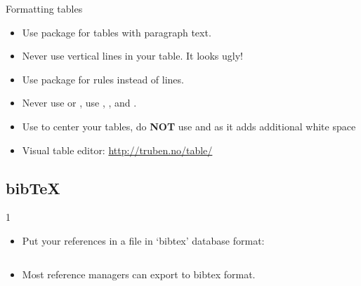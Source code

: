 \documentclass[10pt,times]{beamer}
\begin{document}
\begin{frame}[fragile]{Formatting tables}
\begin{itemize}
\item Use  package for tables with paragraph text.

\item Never use vertical lines in your table. It looks ugly!

\item Use  package for rules instead of lines.

\item Never use  or , use , 
,  and .

\item Use  to center your tables, do 
\textbf{NOT} use  and  as it adds additional 
white space

\item Visual table editor: 
\href{http://truben.no/table/}{http://truben.no/table/}
\end{itemize}
\end{frame}

\subsection{bib\TeX}
\begin{frame}[fragile]{\insertsubsection{} 1}
\begin{itemize}
\item Put your references in a  file in `bibtex' database format:
\inputminted[fontsize=\scriptsize,frame=single]{latex}{bib-example.bib}
\item Most reference managers can export to bibtex format.
\end{itemize}
\end{frame}
\end{document}
